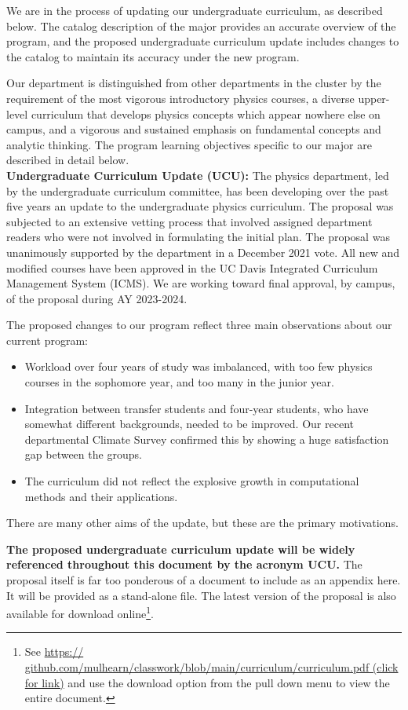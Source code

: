 \documentclass[12pt]{article}
\begin{document}
We are in the process of updating our undergraduate curriculum, as
described below.  The catalog description of the major provides an
accurate overview of the program, and the proposed undergraduate
curriculum update includes changes to the catalog to maintain its
accuracy under the new program.

Our department is distinguished from other departments in the cluster
by the requirement of the most vigorous introductory physics courses,
a diverse upper-level curriculum that develops physics concepts which
appear nowhere else on campus, and a vigorous and sustained emphasis
on fundamental concepts and analytic thinking.  The program learning
objectives specific to our major are described in detail below.\\[3pt]

\noindent
{\bf Undergraduate Curriculum Update (UCU):}
The physics department, led by the undergraduate curriculum committee,
has been developing over the past five years an update to the
undergraduate physics curriculum.  The proposal was subjected to an
extensive vetting process that involved assigned department readers
who were not involved in formulating the initial plan.  The proposal
was unanimously supported by the department in a December 2021 vote.
All new and modified courses have been approved in the UC Davis
Integrated Curriculum Management System (ICMS).  We are working toward
final approval, by campus, of the proposal during AY 2023-2024.

The proposed changes to our program reflect three main observations about our current program: 
\begin{itemize}
 \item Workload over four years of study was imbalanced, with too few physics
courses in the sophomore year, and too many in the junior year. 
 \item Integration between transfer students and
four-year students, who have somewhat different backgrounds, needed to be
improved. Our recent departmental Climate Survey confirmed this by showing a
huge satisfaction gap between the groups. 
 \item  The curriculum did not reflect the explosive growth
in computational methods and their applications.
\end{itemize}
There are many other aims of the update, but these are the primary motivations.

{\bf The proposed undergraduate curriculum update will be widely
  referenced throughout this document by the acronym UCU.}  The
proposal itself is far too ponderous of a document to include as an
appendix here.  It will be provided as a stand-alone file.
The latest version of the proposal is also available for download
online\footnote{See
  \href{https://github.com/mulhearn/classwork/blob/main/curriculum/curriculum.pdf}{https://
github.com/mulhearn/classwork/blob/main/curriculum/curriculum.pdf (click for link)}
  and use the download option from the pull down menu to view the entire document.}.\\[3pt]
\end{document}
